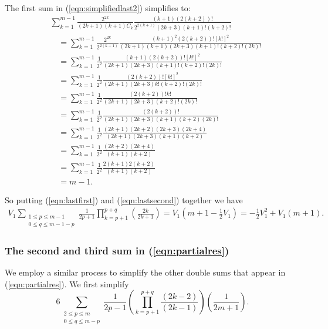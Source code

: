 \documentclass[11pt]{article}
\theoremstyle{definition}
\theoremstyle{definition}
\theoremstyle{plain}
\theoremstyle{plain}
\theoremstyle{plain}
\theoremstyle{definition}
\theoremstyle{definition}
\begin{document}
{The first sum in (\ref{eqn:simplifiedlast2}) simplifies to:
\begin{equation}\label{eqn:lastfirst}
\begin{aligned}
&\sum\limits_{k=1}^{m-1}\frac{2^{2k}}{(2k+1)(k+1)C_k}\frac{(k+1)(2(k+2))!}{2^{2(k+1)}(2k+3)(k+1)!(k+2)!} \\
&\quad= \sum\limits_{k=1}^{m-1}\frac{2^{2k}}{2^{2(k+1)}}\frac{(k+1)^2(2(k+2))![k!]^2}{(2k+1)(k+1)(2k+3)(k+1)!(k+2)!(2k)!} \\
&\quad= \sum\limits_{k=1}^{m-1}\frac{1}{2^2}\frac{(k+1)(2(k+2))![k!]^2}{(2k+1)(2k+3)(k+1)!(k+2)!(2k)!} \\
&\quad= \sum\limits_{k=1}^{m-1}\frac{1}{2^2}\frac{(2(k+2))![k!]^2}{(2k+1)(2k+3)k!(k+2)!(2k)!} \\
&\quad= \sum\limits_{k=1}^{m-1}\frac{1}{2^2}\frac{(2(k+2))!k!}{(2k+1)(2k+3)(k+2)!(2k)!} \\
&\quad = \sum\limits_{k=1}^{m-1}\frac{1}{2^2}\frac{(2(k+2))!}{(2k+1)(2k+3)(k+1)(k+2)(2k)!} \\
&\quad = \sum\limits_{k=1}^{m-1}\frac{1}{2^2}\frac{(2k+1)(2k+2)(2k+3)(2k+4)}{(2k+1)(2k+3)(k+1)(k+2)} \\
&\quad = \sum\limits_{k=1}^{m-1}\frac{1}{2^2}\frac{(2k+2)(2k+4)}{(k+1)(k+2)} \\
&\quad = \sum\limits_{k=1}^{m-1}\frac{1}{2^2}\frac{2(k+1)2(k+2)}{(k+1)(k+2)} \\
&\quad = m-1.
\end{aligned}
\end{equation}

So putting (\ref{eqn:lastfirst}) and (\ref{eqn:lastsecond}) together we have
\begin{equation}\label{eqn:lastsimp}
\begin{aligned}
V_1\sum\limits_{\substack{1\leq p \leq m -1 \\ 0 \leq q \leq m-1-p}}\frac{1}{2p+1}\prod\limits_{k=p+1}^{p+q}\left(\frac{2k}{2k+1}\right) = V_1\left(m+1 - \frac{1}{2}V_1\right) = -\frac{1}{2}V_1^2+V_1(m+1).
\end{aligned}
\end{equation}

\subsubsection*{The second and third sum in (\ref{eqn:partialres})}

We employ a similar process to simplify the other double sums that appear in (\ref{eqn:partialres}). We first simplify
\begin{equation}\label{eqn:third}
6\sum\limits_{\substack{2 \leq p \leq m \\ 0 \leq q \leq m - p}} \frac{1}{2p-1}\left(\prod\limits_{k=p+1}^{p+q}\frac{(2k-2)}{(2k-1)}\right)\left(\frac{1}{2m+1}\right).
\end{equation}

}
\end{document}
